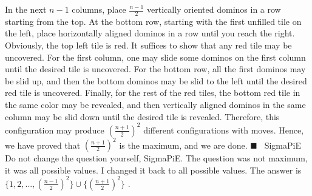 \documentclass[12pt]{article}
\begin{document}
In the next $n-1$ columns, place $\frac{n-1}{2}$ vertically oriented dominos in a row starting from the top. At the bottom row, starting with the first unfilled tile on the left, place horizontally aligned dominos in a row until you reach the right. Obviously, the top left tile is red. It suffices to show that any red tile may be uncovered. For the first column, one may slide some dominos on the first column until the desired tile is uncovered. For the bottom row, all the first dominos may be slid up, and then the bottom dominos may be slid to the left until the desired red tile is uncovered. Finally, for the rest of the red tiles, the bottom red tile in the same color may be revealed, and then vertically aligned dominos in the same column may be slid down until the desired tile is revealed. Therefore, this configuration may produce $(\frac{n+1}{2})^2$ different configurations with moves. Hence, we have proved that $(\frac{n+1}{2})^2$ is the maximum, and we are done. $\blacksquare{}$ ~SigmaPiE Do not change the question yourself, SigmaPiE. The question was not maximum, it was all possible values. I changed it back to all possible values. The answer is $\{1,2,...,(\frac{n-1}{2})^2\}\cup\{(\frac{n+1}{2})^2\}$ .
\end{document}
